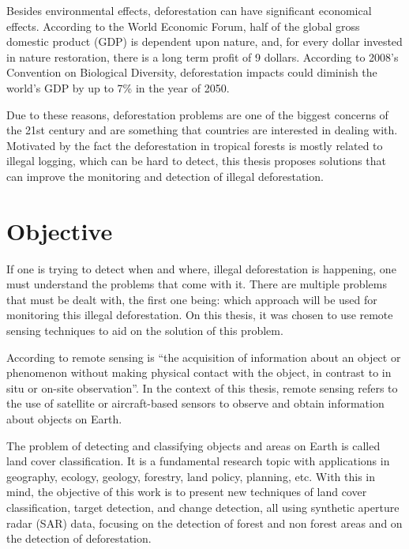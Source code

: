 Besides environmental effects, deforestation can have significant economical effects. According to the World Economic Forum, half of the global gross domestic product (GDP)
is dependent upon nature, and, for every dollar invested in nature restoration, there is a long term profit of 9 dollars.
According to 2008's Convention on Biological Diversity, deforestation impacts could diminish the world's GDP by up to 7\% in the year of 2050.

Due to these reasons, deforestation problems are one of the biggest concerns of the 21st century and are something that countries are interested in dealing with. Motivated by the fact the deforestation in tropical forests is mostly related to illegal
logging, which can be hard to detect, this thesis proposes solutions that can improve the monitoring and detection of illegal deforestation.

\section{Objective}

If one is trying to detect when and where, illegal deforestation is happening, one must understand the problems that come with it. There are multiple problems that must be dealt with, the first one being: which approach will be used for
monitoring this illegal deforestation. On this thesis, it was chosen to use remote sensing techniques to aid on the solution of this problem.

According to \cite{Schott1996RemoteST} remote sensing is ``the acquisition of information about an object or phenomenon without making physical contact with the object, in contrast to in situ or on-site observation''. In the context of this thesis, remote sensing
refers to the use of satellite or aircraft-based sensors to observe and obtain information about objects on Earth.

The problem of detecting and classifying objects and areas on Earth is called land cover classification.
It is a fundamental research topic with applications in geography,
ecology, geology, forestry, land policy, planning, etc. With this in mind, the objective of this work is to present
new techniques of land cover classification, target detection, and change detection,
all using synthetic aperture radar (SAR) data, focusing on the detection of forest and non forest areas and on the detection of deforestation.

